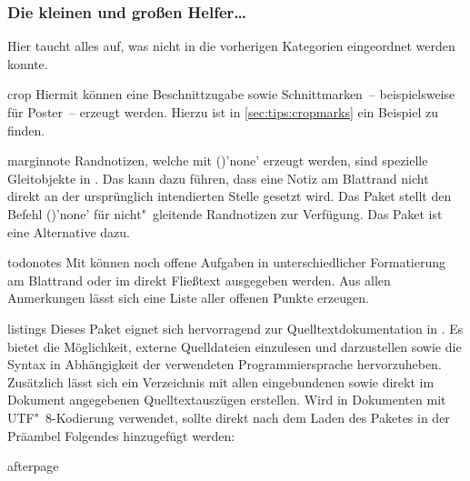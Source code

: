 \subsubsection{Die kleinen und großen Helfer\dots}
Hier taucht alles auf, was nicht in die vorherigen Kategorien eingeordnet 
werden konnte.
%
\begin{packages}
\item[crop]
  Hiermit können eine Beschnittzugabe sowie Schnittmarken~-- beispielsweise für 
  Poster~-- erzeugt werden. Hierzu ist in \autoref{sec:tips:cropmarks} ein 
  Beispiel zu finden.
\item[marginnote]
  Randnotizen, welche mit ()'none' erzeugt
  werden, sind spezielle Gleitobjekte in . Das kann dazu führen, 
  dass eine Notiz am Blattrand nicht direkt an der ursprünglich intendierten 
  Stelle gesetzt wird. Das Paket  stellt den Befehl 
  ()'none' für nicht"~gleitende 
  Randnotizen zur Verfügung. Das Paket  ist eine Alternative 
  dazu.
\item[todonotes]
  Mit  können noch offene Aufgaben in unterschiedlicher 
  Formatierung am Blattrand oder im direkt Fließtext ausgegeben werden. Aus 
  allen Anmerkungen lässt sich eine Liste aller offenen Punkte erzeugen.
\item[listings]
  Dieses Paket eignet sich hervorragend zur Quelltextdokumentation in 
  . Es bietet die Möglichkeit, externe Quelldateien einzulesen 
  und darzustellen sowie die Syntax in Abhängigkeit der verwendeten 
  Programmiersprache hervorzuheben. Zusätzlich lässt sich ein Verzeichnis mit 
  allen eingebundenen sowie direkt im Dokument angegebenen Quelltextauszügen 
  erstellen.
  Wird  in Dokumenten mit UTF"~8-Kodierung verwendet, sollte 
  direkt nach dem Laden des Paketes in der Präambel Folgendes hinzugefügt 
  werden:
  \begin{Code}
  \end{Code}\vspace{-\baselineskip}%
\item[afterpage]

\end{packages}
